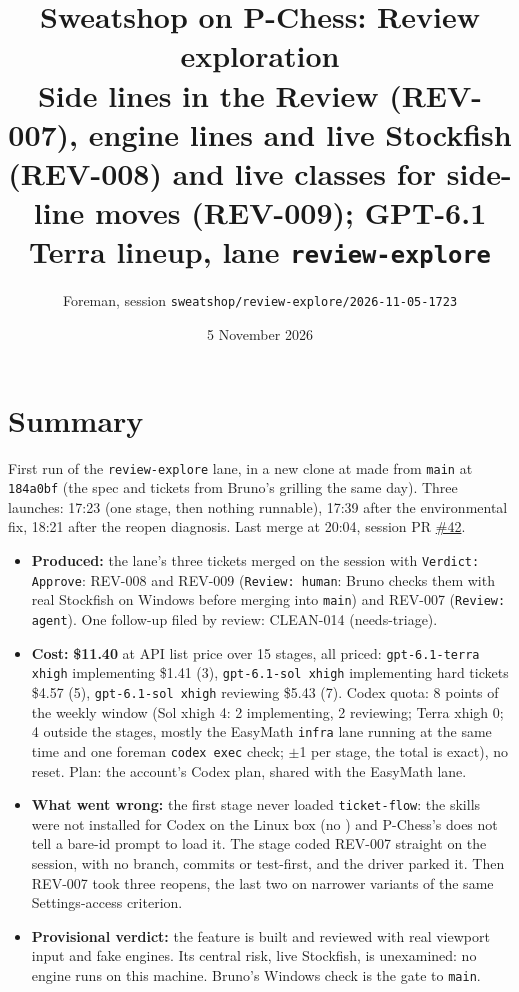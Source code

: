 \documentclass[11pt,a4paper]{article}
\title{Sweatshop on P-Chess: Review exploration\\\large Side lines in the Review (REV-007), engine lines and live Stockfish (REV-008) and live classes for side-line moves (REV-009); GPT-6.1 Terra lineup, lane \texttt{review-explore}}
\author{Foreman, session \texttt{sweatshop/review-explore/2026-11-05-1723}}
\date{5 November 2026}
\begin{document}
\maketitle

\section*{Summary}

First run of the \texttt{review-explore} lane, in a new clone at
 made from \texttt{main} at \texttt{184a0bf} (the spec
and tickets from Bruno's grilling the same day). Three launches: 17:23 (one stage, then nothing
runnable), 17:39 after the environmental fix, 18:21 after the reopen diagnosis. Last merge at 20:04,
session PR \href{https://github.com/Laginho/P-Chess/pull/42}{\#42}.

\begin{itemize}
  \item \textbf{Produced:} the lane's three tickets merged on the session with
        \texttt{Verdict: Approve}: REV-008 and REV-009 (\texttt{Review: human}: Bruno checks them
        with real Stockfish on Windows before merging into \texttt{main}) and REV-007
        (\texttt{Review: agent}). One follow-up filed by review: CLEAN-014 (needs-triage).
  \item \textbf{Cost:} \textbf{\$11.40} at API list price over 15 stages, all priced:
        \texttt{gpt-6.1-terra xhigh} implementing \$1.41 (3), \texttt{gpt-6.1-sol xhigh}
        implementing hard tickets \$4.57 (5), \texttt{gpt-6.1-sol xhigh} reviewing \$5.43 (7).
        Codex quota: 8 points of the weekly window (Sol xhigh 4: 2 implementing, 2 reviewing; Terra
        xhigh 0; 4 outside the stages, mostly the EasyMath \texttt{infra} lane running at the same
        time and one foreman \texttt{codex exec} check; $\pm$1 per stage, the total is exact), no
        reset. Plan: the account's Codex plan, shared with the EasyMath lane.
  \item \textbf{What went wrong:} the first stage never loaded \texttt{ticket-flow}: the skills were
        not installed for Codex on the Linux box (no ) and P-Chess's
         does not tell a bare-id prompt to load it. The stage coded REV-007 straight
        on the session, with no branch, commits or test-first, and the driver parked it. Then
        REV-007 took three reopens, the last two on narrower variants of the same Settings-access
        criterion.
  \item \textbf{Provisional verdict:} the feature is built and reviewed with real viewport input
        and fake engines. Its central risk, live Stockfish, is unexamined: no engine runs on this
        machine. Bruno's Windows check is the gate to \texttt{main}.
\end{itemize}
\end{document}
